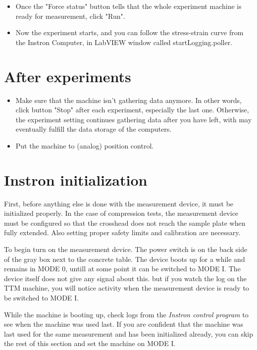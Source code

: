 \documentclass[a4paper]{article}
\begin{document}
\begin{itemize}
  \item Once the "Force status" button tells that the whole experiment machine is ready for measurement, click "Run".
  \item Now the experiment starts, and you can follow the stress-strain curve from the Instron Computer, in LabVIEW  window called startLogging.poller.
\end{itemize}

\section{After experiments}

\begin{itemize}
  \item Make sure that the machine isn't gathering data anymore. In other words, click button "Stop" after each experiment, especially the last one. Otherwise, the experiment setting continues gathering data after you have left, with may eventually fulfill the data storage of the computers.
  \item Put the machine to (analog) position control.
\end{itemize}

\clearpage

\section{Instron initialization}

First, before anything else is done with the measurement device, it
must be initialized properly. In the case of compression tests, the
measurement device must be configured so that the crosshead does not
reach the sample plate when fully extended. Also setting proper safety
limits and calibration are necessary.


To begin turn on the measurement device. The power switch is on the
back side of the gray box next to the concrete table. The device boots
up for a while and remains in \textsf{MODE 0}, untill at some point it
can be switched to \textsf{MODE I}. The device itself does not give
any signal about this. but if you watch the log on the TTM machine,
you will notice activity when the measurement device is ready to be
switched to \textsf{MODE I}.

While the machine is booting up, check logs from the {\it Instron
control program} to see when the machine was used last. If you are
confident that the machine was last used for the same measurement and
has been initialized already, you can skip the rest of this section
and set the machine on \textsf{MODE I}.
\end{document}
